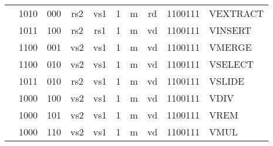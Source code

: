 \begin{table}[p]
\begin{small}
\begin{center}
\begin{tabular}{p{0in}p{0.4in}p{0.1in}p{0.3in}p{0.5in}p{0.5in}p{0.1in}p{0.3in}p{0.5in}p{0.7in}l}
&
\multicolumn{1}{|c|}{1010} &
\multicolumn{2}{c|}{000} &
\multicolumn{1}{c|}{rs2} &
\multicolumn{1}{c|}{vs1} &
\multicolumn{1}{c|}{1} &
\multicolumn{1}{c|}{m} &
\multicolumn{1}{c|}{rd} &
\multicolumn{1}{c|}{1100111} & VEXTRACT \\
\cline{2-10}
  

&
\multicolumn{1}{|c|}{1011} &
\multicolumn{2}{c|}{100} &
\multicolumn{1}{c|}{rs2} &
\multicolumn{1}{c|}{rs1} &
\multicolumn{1}{c|}{1} &
\multicolumn{1}{c|}{m} &
\multicolumn{1}{c|}{vd} &
\multicolumn{1}{c|}{1100111} & VINSERT \\
\cline{2-10}
  

&
\multicolumn{1}{|c|}{1100} &
\multicolumn{2}{c|}{001} &
\multicolumn{1}{c|}{vs2} &
\multicolumn{1}{c|}{vs1} &
\multicolumn{1}{c|}{1} &
\multicolumn{1}{c|}{m} &
\multicolumn{1}{c|}{vd} &
\multicolumn{1}{c|}{1100111} & VMERGE \\
\cline{2-10}
  

&
\multicolumn{1}{|c|}{1100} &
\multicolumn{2}{c|}{010} &
\multicolumn{1}{c|}{vs2} &
\multicolumn{1}{c|}{vs1} &
\multicolumn{1}{c|}{1} &
\multicolumn{1}{c|}{m} &
\multicolumn{1}{c|}{vd} &
\multicolumn{1}{c|}{1100111} & VSELECT \\
\cline{2-10}
  

&
\multicolumn{1}{|c|}{1011} &
\multicolumn{2}{c|}{010} &
\multicolumn{1}{c|}{rs2} &
\multicolumn{1}{c|}{vs1} &
\multicolumn{1}{c|}{1} &
\multicolumn{1}{c|}{m} &
\multicolumn{1}{c|}{vd} &
\multicolumn{1}{c|}{1100111} & VSLIDE \\
\cline{2-10}
  

&
\multicolumn{1}{|c|}{1000} &
\multicolumn{2}{c|}{100} &
\multicolumn{1}{c|}{vs2} &
\multicolumn{1}{c|}{vs1} &
\multicolumn{1}{c|}{1} &
\multicolumn{1}{c|}{m} &
\multicolumn{1}{c|}{vd} &
\multicolumn{1}{c|}{1100111} & VDIV \\
\cline{2-10}
  

&
\multicolumn{1}{|c|}{1000} &
\multicolumn{2}{c|}{101} &
\multicolumn{1}{c|}{vs2} &
\multicolumn{1}{c|}{vs1} &
\multicolumn{1}{c|}{1} &
\multicolumn{1}{c|}{m} &
\multicolumn{1}{c|}{vd} &
\multicolumn{1}{c|}{1100111} & VREM \\
\cline{2-10}
  

&
\multicolumn{1}{|c|}{1000} &
\multicolumn{2}{c|}{110} &
\multicolumn{1}{c|}{vs2} &
\multicolumn{1}{c|}{vs1} &
\multicolumn{1}{c|}{1} &
\multicolumn{1}{c|}{m} &
\multicolumn{1}{c|}{vd} &
\multicolumn{1}{c|}{1100111} & VMUL \\
\cline{2-10}
  


\end{tabular}
\end{center}
\end{small}
\end{table}
